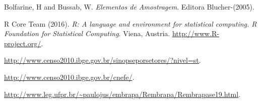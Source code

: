 \documentclass[12pt]{article}\usepackage[]{graphicx}\usepackage[]{color}
\begin{document}
\begin{thebibliography}{99}

 Bolfarine, H and Bussab, W.
\emph{Elementos de Amostragem}.
Editora Blucher-(2005).


 R Core Team (2016).
\emph{R: A language and environment for statistical computing. R Foundation for
  Statistical Computing}.
Viena, Austria. \url{http://www.R-project.org/}.

 \url{http://www.censo2010.ibge.gov.br/sinopseporsetores/?nivel=st}.

 \url{http://www.censo2010.ibge.gov.br/cnefe/}.

 \url{http://www.leg.ufpr.br/~paulojus/embrapa/Rembrapa/Rembrapase19.html}.

\end{thebibliography}
\end{document}
